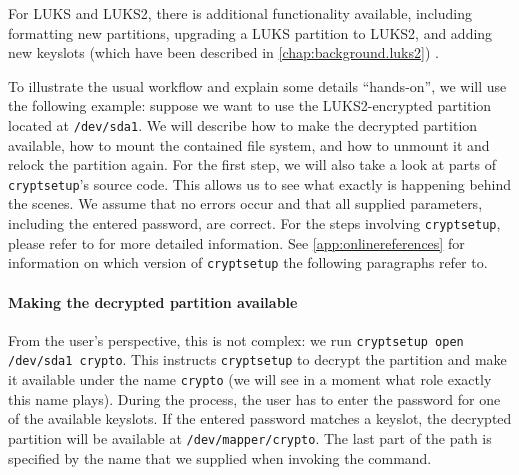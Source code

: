 For LUKS and LUKS2, there is additional functionality available, including formatting new partitions, upgrading a LUKS partition to LUKS2, and adding new keyslots (which have been described in \autoref{chap:background.luks2}) \cite{ManCryptsetup}.

To illustrate the usual workflow and explain some details ``hands-on'', we will use the following example: suppose we want to use the LUKS2-encrypted partition located at \texttt{/dev/sda1}. We will describe how to make the decrypted partition available, how to mount the contained file system, and how to unmount it and relock the partition again. For the first step, we will also take a look at parts of \texttt{cryptsetup}'s source code. This allows us to see what exactly is happening behind the scenes. We assume that no errors occur and that all supplied parameters, including the entered password, are correct. For the steps involving \texttt{cryptsetup}, please refer to \cite{ManCryptsetup} for more detailed information. See \autoref{app:onlinereferences} for information on which version of \texttt{cryptsetup} the following paragraphs refer to.

\paragraph{Making the decrypted partition available}
From the user's perspective, this is not complex: we run \texttt{cryptsetup open /dev/sda1 crypto}. This instructs \texttt{cryptsetup} to decrypt the partition and make it available under the name \texttt{crypto} (we will see in a moment what role exactly this name plays). During the process, the user has to enter the password for one of the available keyslots. If the entered password matches a keyslot, the decrypted partition will be available at \texttt{/dev/mapper/crypto}. The last part of the path is specified by the name that we supplied when invoking the command.

